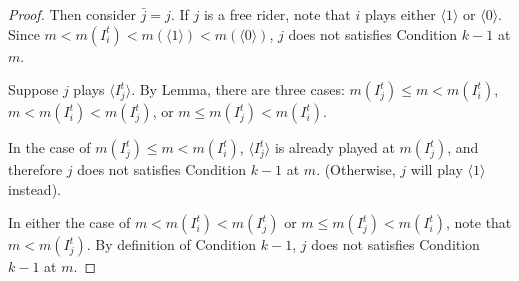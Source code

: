 \documentclass[12pt,letter]{article}
\theoremstyle{definition}
\theoremstyle{remark}
\theoremstyle{claim}
\begin{document}
\begin{proof}
Then consider $\bar{j}=j$. If $j$ is a free rider, note that $i$ plays either $\langle 1 \rangle$ or $\langle 0 \rangle$. Since $m< m(I^t_i)<m(\langle 1 \rangle)<m(\langle 0 \rangle)$, $j$ does not satisfies Condition $k-1$ at $m$.

Suppose $j$ plays $\langle I^t_j \rangle$. By Lemma, there are three cases: $m(I^t_j)\leq m< m(I^t_i)$, $m< m(I^t_i)< m(I^t_j)$, or $m\leq m(I^t_j)< m(I^t_i)$. 

In the case of $m(I^t_j)\leq m< m(I^t_i)$, $\langle I^t_j \rangle$ is already played at $m(I^t_j)$, and therefore $j$ does not satisfies Condition $k-1$ at $m$. (Otherwise, $j$ will play $\langle 1 \rangle$ instead). 

In either the case of $m< m(I^t_i)< m(I^t_j)$ or $m\leq m(I^t_j)< m(I^t_i)$, note that $m<m(I^t_j)$. By definition of Condition $k-1$, $j$ does not satisfies Condition $k-1$ at $m$. 

\end{proof}
\end{document}

